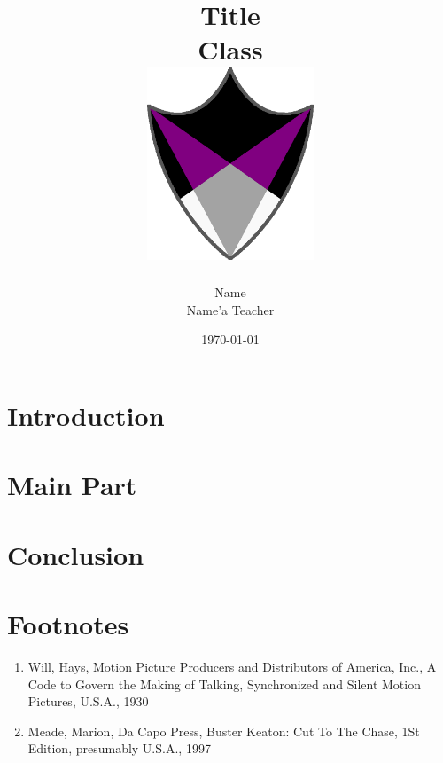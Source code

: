 \documentclass[11pt,a4paper]{article}
\title{
      {Title}\\
      {Class}\\
      {\vspace{1cm}}
      {\includegraphics[width=50mm,scale=1]{aceing_shield.png}}}
\author{Name\\Name'a Teacher}
\date{\today}
\begin{document}
\pagestyle{fancy}
\fancyhead{}
\fancyfoot[C]{\thepage}
\renewcommand{\footrulewidth}{1pt}
\renewcommand{\headrulewidth}{1pt}

\newcommand{\fakesection}[1]{%
  \par\refstepcounter{section}%
  \sectionmark{#1}%
  \addcontentsline{toc}{section}{\protect\numberline{\thesection}#1}%
}

\newcommand{\fakesubsection}[1]{%
  \par\refstepcounter{subsection}%
  \sectionmark{#1}%
  \addcontentsline{toc}{subsection}{\protect\numberline{\thesubsection}#1}%
}

\onehalfspacing
\maketitle
\thispagestyle{empty}
\newpage
\tableofcontents
\thispagestyle{empty}
\newpage


\section{Introduction}

\clearpage

\section{Main Part}

\clearpage

\section{Conclusion}

\clearpage

\section{Footnotes}

\renewcommand{\labelenumi}{\alph{enumi})} %
\begin{enumerate}
\item Will, Hays, Motion Picture Producers and Distributors of America, Inc., A Code to Govern the Making of Talking, Synchronized and Silent Motion Pictures, U.S.A., 1930
\item Meade, Marion,‎ Da Capo Press, Buster Keaton: Cut To The Chase, 1St Edition, presumably U.S.A., 1997
\end{enumerate}
\end{document}
